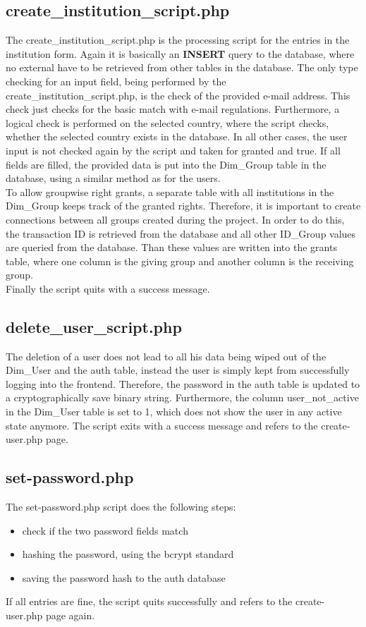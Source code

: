 \subsection{create\_institution\_script.php}
The create\_institution\_script.php is the processing script for the entries in the institution form. Again it is basically an \textbf{INSERT} query to the database, where no 
external have to be retrieved from other tables in the database. The only type checking for an input field, being performed by the create\_institution\_script.php, is the check 
of the provided e-mail address. This check just checks for the basic match with e-mail regulations. Furthermore, a logical check is performed on the selected country, where the 
script checks, whether the selected country exists in the database. In all other cases, the user input is not checked again by the script and taken for granted and true. 
If all fields are filled, the provided data is put into the Dim\_Group table in the database, using a similar method as for the users.\\
To allow groupwise right grants, a separate table with all institutions in the Dim\_Group keeps track of the granted rights. Therefore, it is important to create connections between 
all groups created during the project. In order to do this, the transaction ID is retrieved from the database and all other ID\_Group values are queried from the database. Than 
these values are written into the grants table, where one column is the giving group and another column is the receiving group. \\
Finally the script quits with a success message.

\subsection{delete\_user\_script.php}
The deletion of a user does not lead to all his data being wiped out of the Dim\_User and the auth table, instead the user is simply kept from successfully logging into the frontend. 
Therefore, the password in the auth table is updated to a cryptographically save binary string. Furthermore, the column user\_not\_active in the Dim\_User table is set to 1, which 
does not show the user in any active state anymore. The script exits with a success message and refers to the create-user.php page.

\subsection{set-password.php}
The set-password.php script does the following steps:
\begin{itemize}
\item check if the two password fields match
\item hashing the password, using the bcrypt standard
\item saving the password hash to the auth database
\end{itemize}
If all entries are fine, the script quits successfully and refers to the create-user.php page again.

